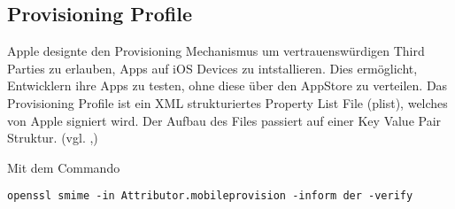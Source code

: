 \subsection{Provisioning Profile}
\label{sec:ProvisioningProfile}
Apple designte den Provisioning Mechanismus um vertrauenswürdigen Third Parties zu erlauben, Apps auf iOS Devices zu intstallieren. Dies ermöglicht, Entwicklern ihre Apps zu testen, ohne diese über den AppStore zu verteilen. Das \glqq Provisioning Profile\grqq{} ist ein XML strukturiertes \glqq Property List File (plist)\grqq, welches von Apple signiert wird. Der Aufbau des Files passiert auf einer \glqq Key Value Pair\grqq{} Struktur. 
(vgl. \cite{PropertyFile[1]},\cite{ProvisioningProfile[1]}) \par

Mit dem Commando 

\lstset{
    language=bash,
    }
\begin{lstlisting}[caption={Openssl-Befehl: Struktur Provisioning Profile }]
    openssl smime -in Attributor.mobileprovision -inform der -verify 
\end{lstlisting}

 

